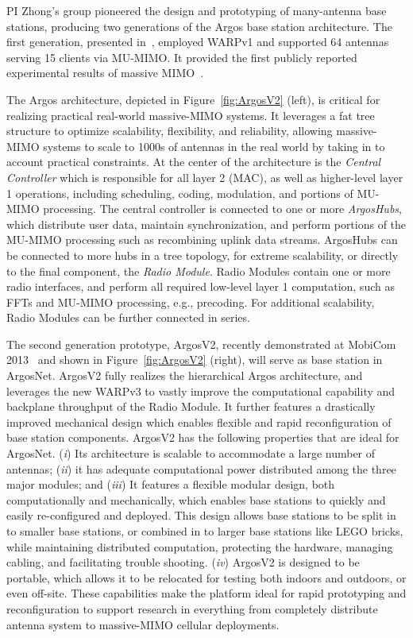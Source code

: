 PI Zhong's group pioneered the design and prototyping of many-antenna base stations, producing two generations of the Argos base station architecture.
The first generation, presented in~\cite{shepard2012mobicom}, employed WARPv1 and supported 64 antennas serving 15 clients via MU-MIMO.  
It provided the first publicly reported experimental results of massive MIMO~\cite{shepard2012mobicom}.
 
The Argos architecture, depicted in Figure~\ref{fig:ArgosV2} (left),  is critical for realizing practical real-world massive-MIMO systems. 
It leverages a fat tree structure to optimize scalability, flexibility, and reliability, allowing massive-MIMO systems to scale to 1000s of antennas in the real world by taking in to account practical constraints. 
At the center of the architecture is the \emph{Central Controller} which is responsible for all layer 2 (MAC), as well as higher-level layer 1 operations, including scheduling, coding, modulation, and portions of MU-MIMO processing.
The central controller is connected to one or more \emph{ArgosHubs}, which distribute user data, maintain synchronization, and perform portions of the MU-MIMO processing such as recombining uplink data streams.
ArgosHubs can be connected to more hubs in a tree topology, for extreme scalability, or directly to the final component, the \emph{Radio Module}.
Radio Modules contain one or more radio interfaces, and perform all required low-level layer 1 computation, such as FFTs and MU-MIMO processing, e.g., precoding.
For additional scalability, Radio Modules can be further connected in series.

The second generation prototype, ArgosV2, recently demonstrated at MobiCom 2013~\cite{ArgosV2} and shown in Figure~\ref{fig:ArgosV2} (right), will serve as base station in ArgosNet.
ArgosV2 fully realizes the hierarchical Argos architecture, and leverages the new WARPv3 to vastly improve the computational capability and backplane throughput of the Radio Module.
It further features a drastically improved mechanical design which enables flexible and rapid reconfiguration of base station components.
ArgosV2 has the following properties that are ideal for ArgosNet. (\textit{i}) Its architecture is scalable to accommodate a large number of antennas; (\textit{ii}) it has adequate computational power distributed among the three major modules; and
(\textit{iii}) It features a flexible modular design, both computationally and mechanically, which enables base stations to quickly and easily re-configured and deployed. 
This design allows base stations to be split in to smaller base stations, or combined in to larger base stations like LEGO bricks, while maintaining distributed computation, protecting the hardware, managing cabling, and facilitating trouble shooting. (\textit{iv}) ArgosV2 is designed to be portable, which allows it to be relocated for testing both indoors and outdoors, or even off-site.  
These capabilities make the platform ideal for rapid prototyping and reconfiguration to support research in everything from completely distribute antenna system to massive-MIMO cellular deployments.

